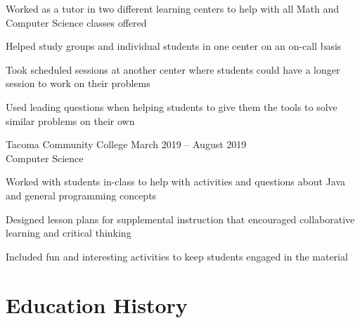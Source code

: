 \documentclass[10pt]{article}
\newenvironment{itemize*}
{\begin{itemize}[leftmargin=*]
    \setlength{\parskip}{0.5pt}}
{\end{itemize}}
\begin{document}
\begin{itemize*}
\item Worked as a tutor in two different learning centers to help
      with all Math and Computer Science classes offered
\item Helped study groups and individual students in one center on an on-call basis
\item Took scheduled sessions at another center where students could have a
      longer session to work on their problems
\item Used leading questions when helping students to give them the tools to
      solve similar problems on their own
\end{itemize*}
\vspace{10pt}

\begin{description}[leftmargin=!,
                    labelwidth=\widthof{\bfseries Supplementary Instruction Leader}]

\item[Supplementary Instruction Leader] Tacoma Community College \hfill
    March 2019 – August 2019\\
    Computer Science
\end{description}
\begin{itemize*}
\item Worked with students in-class to help with activities and questions about
      Java and general programming concepts
\item Designed lesson plans for supplemental instruction that
      encouraged collaborative learning and critical thinking
\item Included fun and interesting activities to keep students engaged in the material
\end{itemize*}

\section*{Education History}
\end{document}

